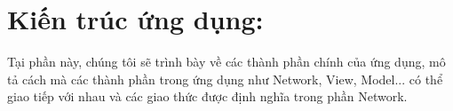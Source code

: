 \section{Kiến trúc ứng dụng: }
Tại phần này, chúng tôi sẽ trình bày về các thành phần chính của ứng dụng, mô tả cách mà các thành phần trong ứng dụng như Network, View, Model... có thể giao tiếp với nhau và các giao thức được định nghĩa trong phần Network.



